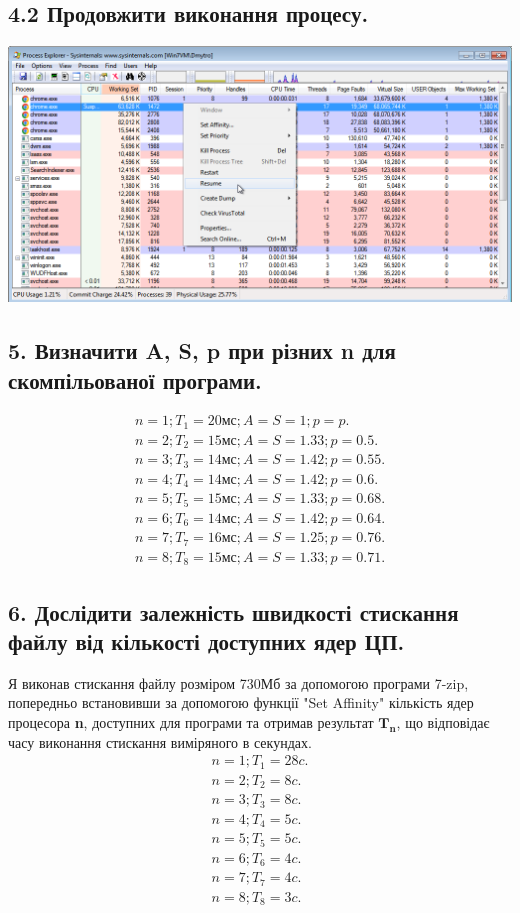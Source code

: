 \documentclass{article}
\begin{document}
\begin{normalsize}
	\subsection*{4.2 Продовжити виконання процесу.}
	\begin{center}
		\includegraphics[scale=0.49]{suspend2}
	\end{center}

	\subsection*{5. Визначити A, S, p при різних n для скомпільованої програми.}
	\begin{gather}\nonumber
		n=1; T_1=20\text{мс}; A=S=1; p=p.\\\nonumber
		n=2; T_2 =15\text{мс}; A=S=1.33; p=0.5.\\\nonumber
		n=3; T_3 =14\text{мс}; A=S=1.42; p=0.55.\\\nonumber
		n=4; T_4 =14\text{мс}; A=S=1.42; p=0.6.\\\nonumber
		n=5; T_5 =15\text{мс}; A=S=1.33; p=0.68.\\\nonumber
		n=6; T_6 =14\text{мс}; A=S=1.42; p=0.64.\\\nonumber
		n=7; T_7 =16\text{мс}; A=S=1.25; p=0.76.\\\nonumber
		n=8; T_8 =15\text{мс}; A=S=1.33; p=0.71.\nonumber
	\end{gather}

	\subsection*{6. Дослідити залежність швидкості стискання файлу від кількості доступних ядер ЦП.}
	Я виконав стискання файлу розміром 730Мб за допомогою програми 7-zip, попередньо встановивши за допомогою функції "Set Affinity" кількість ядер процесора \textbf{n}, доступних для програми та отримав результат $\bm{T_n}$, що відповідає часу виконання стискання виміряного в секундах.
	\begin{gather}\nonumber
		n=1; T_1=28c.\\\nonumber
		n=2; T_2=8c.\\\nonumber
		n=3; T_3=8c.\\\nonumber
		n=4; T_4=5c.\\\nonumber
		n=5; T_5=5c.\\\nonumber
		n=6; T_6=4c.\\\nonumber
		n=7; T_7=4c.\\\nonumber
		n=8; T_8=3c.\nonumber
	\end{gather}


\end{normalsize}
\end{document}
